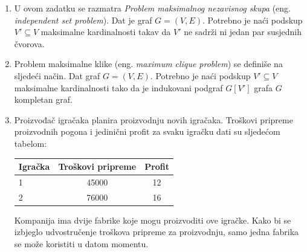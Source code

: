 \documentclass[a4paper, utf8, 11pt, colorlinks]{book}
\theoremstyle{definition}
\begin{document}
\begin{enumerate}
\item U ovom zadatku se razmatra  \emph{Problem maksimalnog nezavisnog skupa} (eng. \emph{independent set problem}). Dat je graf $G = (V, E)$. Potrebno je naći podskup $V' \subseteq V$ maksimalne kardinalnosti takav da  $V'$ ne sadrži ni jedan par susjednih čvorova. 
\item Problem maksimalne klike (eng. \emph{maximum clique problem}) se definiše na sljedeći način.  Dat graf $G = (V, E)$. Potrebno je naći podskup $V' \subseteq V$ maksimalne kardinalnosti tako da je indukovani podgraf 
$G[V']$ grafa $G$ kompletan graf. 
\item %
Proizvođač igračaka planira proizvodnju novih igračaka. Troškovi pripreme proizvodnih pogona i jedinični profit za svaku igračku dati su sljedećom tabelom: 
 \begin{table}[H]
	\centering
	\begin{tabular}{l|cc} 
	  \hline
	  Igračka &  Troškovi pripreme    & Profit \\ \hline
	  1       &  45000     &  12     \\
	  2       &  76000     &  16     \\	\hline
	\end{tabular} 
\end{table}
 Kompanija ima dvije fabrike koje mogu proizvoditi ove igračke. Kako bi se izbjeglo udvostručenje troškova pripreme za proizvodnju,  samo jedna fabrika se može koristiti u datom momentu. 
 

\end{enumerate}
\end{document}
